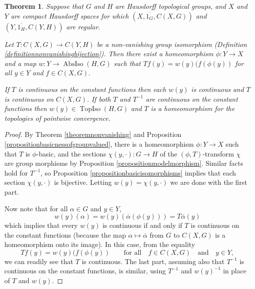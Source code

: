 \documentclass[letter,11pt]{amsart}
\theoremstyle{plain}		\newtheorem{theorem}[generalnumbering]{Theorem}
\theoremstyle{plain}		\newtheorem{corollary}[generalnumbering]{Corollary}
\theoremstyle{definition}		\newtheorem{definition}[generalnumbering]{Definition}
\theoremstyle{definition}		\newtheorem{example}[generalnumbering]{Example}
\theoremstyle{plain}		\newtheorem{proposition}[generalnumbering]{Proposition}
\theoremstyle{plain}		\newtheorem{lemma}[generalnumbering]{Lemma}
\theoremstyle{definition}
\begin{document}
\begin{theorem}
	Suppose that $G$ and $H$ are Hausdorff topological groups, and $X$ and $Y$ are compact Hausdorff spaces for which $(X,\overline{1_G},C(X,G))$ and $(Y,\overline{1_H},C(Y,H))$ are regular.
	
	Let $T\colon C(X,G)\to C(Y,H)$ be a non-vanishing group isomorphism (Definition \ref{definitionnonvanishingbijection}). Then there exist a homeomorphism $\phi\colon Y\to X$ and a map $w\colon Y\to\operatorname{AbsIso}(H,G)$ such that $Tf(y)=w(y)(f(\phi(y))$ for all $y\in Y$ and $f\in C(X,G)$.
	
	If $T$ is continuous on the constant functions then each $w(y)$ is continuous and $T$ is continuous on $C(X,G)$. If both $T$ and $T^{-1}$ are continuous on the constant functions then $w(y)\in\operatorname{TopIso}(H,G)$ and $T$ is a homeomorphism for the topologies of pointwise convergence.
\end{theorem}
\begin{proof}
	By Theorem \ref{theoremnonvanishing} and Proposition \ref{propositionbasicnessofgroupvalued}, there is a homeomorphism $\phi\colon Y\to X$ such that $T$ is $\phi$-basic, and the sections $\chi(y,\cdot)\colon G\to H$ of the $(\phi,T)$-transform $\chi$ are group morphisms by Proposition \ref{propositionmodelmorphism}. Similar facts hold for $T^{-1}$, so Proposition \ref{propositionbasicisomorphisms} implies that each section $\chi(y,\cdot)$ is bijective. Letting $w(y)=\chi(y,\cdot)$ we are done with the first part.
	
	Now note that for all $\alpha\in G$ and $y\in Y$,
	\[w(y)(\alpha)=w(y)(\overline{\alpha}(\phi(y)))=T\overline{\alpha}(y)\]
	which implies that every $w(y)$ is continuous if and only if $T$ is continuous on the constant functions (because the map $\alpha\mapsto\overline{\alpha}$ from $G$ to $C(X,G)$ is a homeomorphism onto its image). In this case, from the equality
	\[Tf(y)=w(y)(f(\phi(y))\qquad\text{for all}\quad f\in C(X,G)\quad\text{and}\quad y\in Y,\]
	we can readily see that $T$ is continuous. The last part, assuming also that $T^{-1}$ is continuous on the constant functions, is similar, using $T^{-1}$ and $w(y)^{-1}$ in place of $T$ and $w(y)$.
\end{proof}

\end{document}
